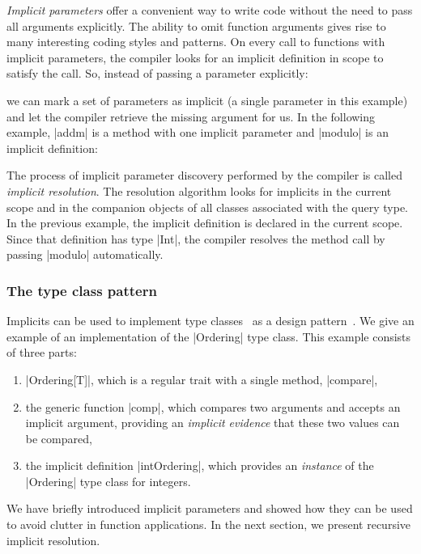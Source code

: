 \emph{Implicit parameters} offer a convenient way to write code without the need to pass all arguments explicitly.
The ability to omit function arguments gives rise to many interesting coding styles and patterns.
On every call to functions with implicit parameters, the compiler looks for an implicit definition in scope to satisfy the call.
So, instead of passing a parameter explicitly:

\explicitModulo

\noindent
we can mark a set of parameters as implicit (a single parameter in this example) and let the compiler retrieve the missing argument for us.
In the following example, |addm| is a method with one implicit parameter and |modulo| is an implicit definition:

\implicitModulo

The process of implicit parameter discovery performed by the compiler is called \emph{implicit resolution}.
The resolution algorithm looks for implicits in the current scope and in the companion objects of all classes associated with the query type.
In the previous example, the implicit definition is declared in the current scope.
Since that definition has type |Int|, the compiler resolves the method call by passing |modulo| automatically.

\subsubsection{The type class pattern}

Implicits can be used to implement type classes~\citep{wadler1989how} as a design pattern~\citep{oliveira2010type}.
We give an example of an implementation of the |Ordering| type class.
This example consists of three parts:

\begin{enumerate}
  \item |Ordering[T]|, which is a regular trait with a single method, |compare|,
  \item the generic function |comp|, which compares two arguments and accepts an implicit argument, providing an \emph{implicit evidence} that these two values can be compared,
  \item the implicit definition |intOrdering|, which provides an \emph{instance} of the |Ordering| type class for integers.
\end{enumerate}

\ordExample

We have briefly introduced implicit parameters and showed how they can be used to avoid clutter in function applications.
In the next section, we present recursive implicit resolution.

